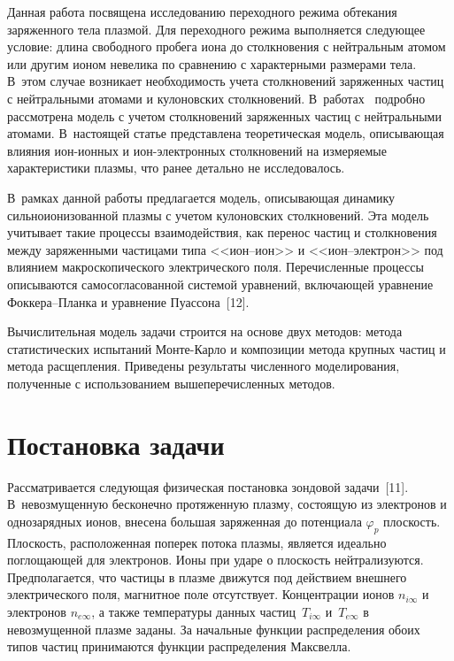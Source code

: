\begin{multicols}{2}
Данная работа посвящена исследованию переходного режима обтекания заряженного тела плазмой. Для 
переходного режима выполняется следующее условие: длина свободного пробега иона до столкновения 
с нейтральным атомом или другим ионом невелика по сравнению с характерными размерами тела. 
В~этом случае возникает необходимость учета столкновений заряженных частиц с нейтральными 
атомами и кулоновских столкновений. В~работах~\cite{10-k, 11-k} подробно рассмотрена модель с 
учетом столкновений заряженных частиц с нейтральными атомами. В~настоящей статье представлена 
теоретическая модель, описывающая влияния ион-ионных и ион-элек\-т\-рон\-ных столкновений на 
измеряемые характеристики плазмы, что ранее детально не исследовалось.
      
      В~рамках данной работы предлагается модель, описывающая динамику сильноионизованной 
плазмы с учетом кулоновских столкновений. Эта модель учитывает такие процессы взаимодействия, 
как перенос частиц и столкновения между заряженными частицами типа <<ион--ион>> и 
      <<ион--электрон>> под влиянием макроскопического электрического поля. Перечисленные 
процессы описываются самосогласованной системой уравнений, включающей уравнение 
      Фок\-ке\-ра--План\-ка и уравнение Пуассона~[12].
      
      Вычислительная модель задачи строится на основе двух методов: метода статистических 
испытаний Мон\-те-Кар\-ло и композиции метода крупных частиц и метода расщепления. Приведены 
результаты численного моделирования, полученные с использованием вышеперечисленных методов.

\vspace*{-4pt}

\section{Постановка задачи}

\vspace*{-2pt}

Рассматривается следующая физическая постановка зондовой задачи~[11]. В~невозмущенную 
бесконечно протяженную плазму, состоящую из электронов и однозарядных ионов, внесена большая\linebreak 
заряженная до потенциала $\varphi_p$ плоскость. Плоскость, расположенная поперек потока плазмы, 
является идеально поглощающей для электронов. Ионы при ударе о плоскость нейтрализуются. 
Предполагается, что частицы в плазме движутся под действием внешнего электрического поля, 
магнитное поле отсутствует. Концентрации ионов $n_{i\infty}$ и электронов $n_{e\infty}$, а также 
температуры данных час\-тиц~$T_{i\infty}$ 
и~$T_{e\infty}$ в невозмущенной плазме заданы. За начальные 
функции распределения обоих типов час\-тиц принимаются функции распределения Максвелла. 
      

\end{multicols}
